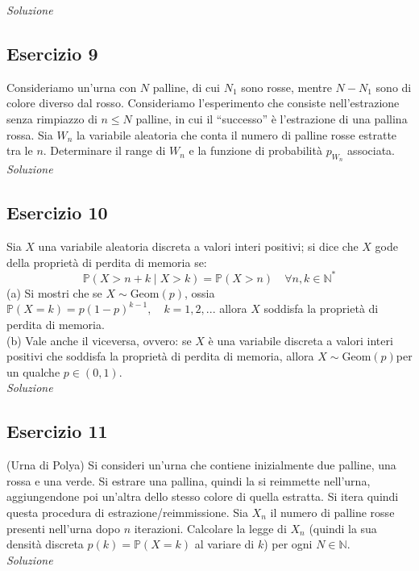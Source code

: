 \textit{Soluzione}

\subsection{Esercizio 9}
Consideriamo un’urna con $N$ palline, di cui $N_1$ sono rosse, mentre $N - N_1$ sono di colore diverso dal rosso. Consideriamo l’esperimento che consiste nell’estrazione senza rimpiazzo di $n \leq  N$ palline, in cui il “successo” è l’estrazione di una pallina rossa.
Sia $W_n$ la variabile aleatoria che conta il numero di palline rosse estratte tra le $n$. Determinare il range di $W_n$ e la funzione di probabilità $p_{W_n}$ associata.
\\

\textit{Soluzione}

\subsection{Esercizio 10} Sia $X$ una variabile aleatoria discreta a valori interi positivi; si dice che $X$ gode della proprietà di
perdita di memoria se:
\[\mathbb{P}(X > n + k \mid X > k) = \mathbb{P}(X>n) \quad \forall n,k \in \mathbb{N}^*\]
(a) Si mostri che se $X \sim \text{Geom}(p)$, ossia $\mathbb{P}(X=k)=p(1-p)^{k-1}, \quad k=1,2,...$ allora $X$ soddisfa la proprietà di perdita di memoria. \\
(b) Vale anche il viceversa, ovvero: se $X$ è una variabile discreta a valori interi positivi che soddisfa
la proprietà di perdita di memoria, allora $X \sim \text{Geom}(p) $per un qualche $p \in (0, 1)$.
\\

\textit{Soluzione}

\subsection{Esercizio 11}
(Urna di Polya) Si consideri un’urna che contiene inizialmente due palline, una rossa e una verde. Si estrare una pallina, quindi la si reimmette nell’urna, aggiungendone poi un’altra dello stesso colore di quella estratta. Si itera quindi questa procedura di estrazione/reimmissione. Sia $X_n$  il numero di palline rosse presenti nell’urna dopo $n$ iterazioni. Calcolare la legge di $X_n$ (quindi la sua densità discreta $p(k) = \mathbb{P}(X = k) $ al variare di $k$) per ogni $N \in \mathbb{N}$.
\\

\textit{Soluzione}

